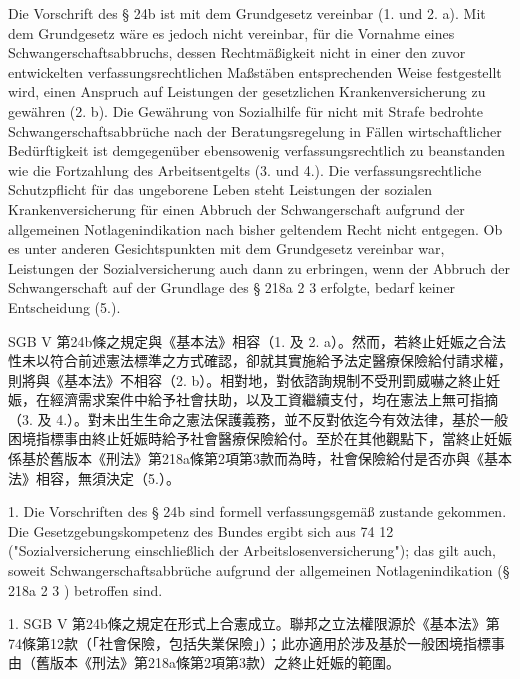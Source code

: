 \documentclass[12pt]{article}
\begin{document}

\begin{sourcepara}[title={原文E.195}]
Die Vorschrift des § 24b \abbrSGBV{} ist mit dem Grundgesetz vereinbar (1. und 2. a). Mit dem Grundgesetz wäre es jedoch nicht vereinbar, für die Vornahme eines Schwangerschaftsabbruchs, dessen Rechtmäßigkeit nicht in einer den zuvor entwickelten verfassungsrechtlichen Maßstäben entsprechenden Weise festgestellt wird, einen Anspruch auf Leistungen der gesetzlichen Krankenversicherung zu gewähren (2. b). Die Gewährung von Sozialhilfe für nicht mit Strafe bedrohte Schwangerschaftsabbrüche nach der Beratungsregelung in Fällen wirtschaftlicher Bedürftigkeit ist demgegenüber ebensowenig verfassungsrechtlich zu beanstanden wie die Fortzahlung des Arbeitsentgelts (3. und 4.). Die verfassungsrechtliche Schutzpflicht für das ungeborene Leben steht Leistungen der sozialen Krankenversicherung für einen Abbruch der Schwangerschaft aufgrund der allgemeinen Notlagenindikation nach bisher geltendem Recht nicht entgegen. Ob es unter anderen Gesichtspunkten mit dem Grundgesetz vereinbar war, Leistungen der Sozialversicherung auch dann zu erbringen, wenn der Abbruch der Schwangerschaft auf der Grundlage des § 218a \abbrAbs{} 2 \abbrNr{} 3 \abbrStGB{} \abbrAF{} erfolgte, bedarf keiner Entscheidung (5.).
\end{sourcepara}
\begin{transpara}
SGB V 第24b條之規定與《基本法》相容（1. 及 2. a）。然而，若終止妊娠之合法性未以符合前述憲法標準之方式確認，卻就其實施給予法定醫療保險給付請求權，則將與《基本法》不相容（2. b）。相對地，對依諮詢規制不受刑罰威嚇之終止妊娠，在經濟需求案件中給予社會扶助，以及工資繼續支付，均在憲法上無可指摘（3. 及 4.）。對未出生生命之憲法保護義務，並不反對依迄今有效法律，基於一般困境指標事由終止妊娠時給予社會醫療保險給付。至於在其他觀點下，當終止妊娠係基於舊版本《刑法》第218a條第2項第3款而為時，社會保險給付是否亦與《基本法》相容，無須決定（5.）。
\end{transpara}

\begin{sourcepara}[title={原文E.196}]
1. Die Vorschriften des § 24b \abbrSGBV{} sind formell verfassungsgemäß zustande gekommen. Die Gesetzgebungskompetenz des Bundes ergibt sich aus \abbrArt{} 74 \abbrNr{} 12 \abbrGG{}\ggfnArtSeventyFourTwelveDE{} ("Sozialversicherung einschließlich der Arbeitslosenversicherung"); das gilt auch, soweit Schwangerschaftsabbrüche aufgrund der allgemeinen Notlagenindikation (§ 218a \abbrAbs{} 2 \abbrNr{} 3 \abbrStGB{} \abbrAF{}) betroffen sind.
\end{sourcepara}
\begin{transpara}
1. SGB V 第24b條之規定在形式上合憲成立。聯邦之立法權限源於《基本法》第74條第12款\ggfnArtSeventyFourTwelveZH{}（「社會保險，包括失業保險」）；此亦適用於涉及基於一般困境指標事由（舊版本《刑法》第218a條第2項第3款）之終止妊娠的範圍。
\end{transpara}
\end{document}
